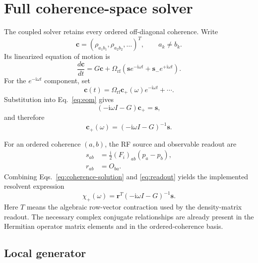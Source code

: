 \documentclass[11pt]{article}
\newcommand{\ii}{\mathrm{i}}
\newcommand{\Omrf}{\Omega_{\mathrm{rf}}}
\begin{document}
\section{Full coherence-space solver}

The coupled solver retains every ordered off-diagonal coherence.  Write
\begin{equation}
  \bm c=(\rho_{a_1b_1},\rho_{a_2b_2},\ldots)^T,
  \qquad a_k\ne b_k.
\end{equation}
Its linearized equation of motion is
\begin{equation}
  \frac{d\bm c}{dt}=G\bm c
  +\Omrf\left(\bm s e^{-\ii\omega t}
  +\bm s_-e^{+\ii\omega t}\right).
  \label{eq:eom}
\end{equation}
For the $e^{-\ii\omega t}$ component, set
\begin{equation}
  \bm c(t)=\Omrf\bm c_+(\omega)e^{-\ii\omega t}+\cdots.
\end{equation}
Substitution into Eq.~\eqref{eq:eom} gives
\begin{equation}
  (-\ii\omega I-G)\bm c_+=\bm s,
\end{equation}
and therefore
\begin{equation}
  \boxed{\bm c_+(\omega)=(-\ii\omega I-G)^{-1}\bm s.}
  \label{eq:coherence-solution}
\end{equation}

For an ordered coherence $(a,b)$, the RF source and observable readout are
\begin{align}
  s_{ab}&=\frac{\ii}{2}(F_i)_{ab}(p_a-p_b),
  \label{eq:source}\\
  r_{ab}&=O_{ba}.
  \label{eq:readout}
\end{align}
Combining Eqs.~\eqref{eq:coherence-solution} and \eqref{eq:readout} yields
the implemented resolvent expression
\begin{equation}
  \boxed{
  \chi_+(\omega)=\bm r^T(-\ii\omega I-G)^{-1}\bm s.}
  \label{eq:resolvent}
\end{equation}
Here $T$ means the algebraic row-vector contraction used by the density-matrix
readout.  The necessary complex conjugate relationships are already present
in the Hermitian operator matrix elements and in the ordered-coherence basis.

\subsection{Local generator}
\end{document}
